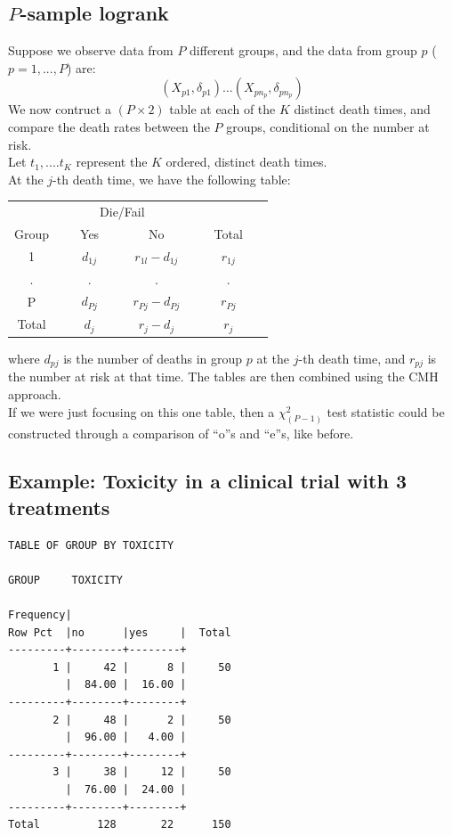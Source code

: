 \documentclass[11pt,slidesonly,semrot,portrait,palatino]{book}
\begin{document}
{\subsection{$P$-sample logrank}
Suppose we observe data from $P$ different groups, and
 the data from group $p$ ($p=1,...,P$) are:
\[ (X_{p1},\delta_{p1}) \dots
(X_{p n_p},\delta_{p n_p}) \]
We now contruct a $(P \times 2)$ table at each of
the $K$ distinct death times, and compare the death rates
between the $P$ groups, conditional on the number at risk.
\\[2ex]
Let $t_1,....t_K$ represent the $K$ ordered, distinct death
times.
\\[2ex]
At the $j$-th death time, we have the following table:
\begin{center}
\begin{tabular}{cccc}
\hline \hline
& \multicolumn{2}{c}{Die/Fail} & \\ \cline{2-3}
\multicolumn{1}{c}{Group } & ~~~Yes~~~ & ~~~No~~~ & ~~~Total~~~\\ \hline
1 &  $d_{1j}$  & $r_{1l} - d_{1j}$ & $r_{1j}$ \\[2ex]
. &    .       &     .             &       .    \\[2ex]
P & $d_{Pj}$   & $r_{Pj} - d_{Pj}$ & $r_{Pj}$  \\ \hline
Total &  $d_j  $ & $r_j - d_j  $ & $r_j  $  \\ \hline \hline
\end{tabular}
\end{center}
where $d_{pj}$ is  the number of deaths in
group $p$ at the $j$-th death time, and
$r_{pj}$ is the number at risk at that time.
The tables are then combined using the CMH approach.
\\[2ex]
If we were just focusing on this one table, then a $\chi^2_{(P-1)}$
test statistic could be constructed through a comparison of ``o''s and
``e''s, like before.
\subsection{Example: Toxicity in a clinical trial with 3 treatments}
\begin{verbatim}
TABLE OF GROUP BY TOXICITY

GROUP     TOXICITY

Frequency|
Row Pct  |no      |yes     |  Total
---------+--------+--------+
       1 |     42 |      8 |     50
         |  84.00 |  16.00 |
---------+--------+--------+
       2 |     48 |      2 |     50
         |  96.00 |   4.00 |
---------+--------+--------+
       3 |     38 |     12 |     50
         |  76.00 |  24.00 |
---------+--------+--------+
Total         128       22      150


\end{verbatim}}
\end{document}

